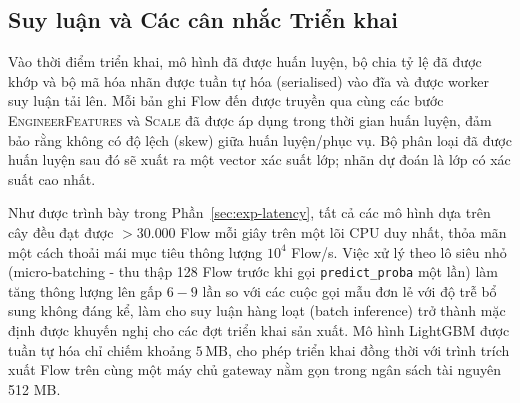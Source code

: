 \subsection{Suy luận và Các cân nhắc Triển khai}
\label{sec:inference}

Vào thời điểm triển khai, mô hình đã được huấn luyện, bộ chia tỷ lệ đã được khớp và bộ mã hóa nhãn được tuần tự hóa (serialised) vào đĩa và được worker suy luận tải lên. Mỗi bản ghi Flow đến được truyền qua cùng các bước \textsc{EngineerFeatures} và \textsc{Scale} đã được áp dụng trong thời gian huấn luyện, đảm bảo rằng không có độ lệch (skew) giữa huấn luyện/phục vụ. Bộ phân loại đã được huấn luyện sau đó sẽ xuất ra một vector xác suất lớp; nhãn dự đoán là lớp có xác suất cao nhất.

Như được trình bày trong Phần~\ref{sec:exp-latency}, tất cả các mô hình dựa trên cây đều đạt được $> 30{.}000$ Flow mỗi giây trên một lõi CPU duy nhất, thỏa mãn một cách thoải mái mục tiêu thông lượng $10^4$ Flow/s. Việc xử lý theo lô siêu nhỏ (micro-batching - thu thập 128 Flow trước khi gọi \texttt{predict\_proba} một lần) làm tăng thông lượng lên gấp $6{-}9$ lần so với các cuộc gọi mẫu đơn lẻ với độ trễ bổ sung không đáng kể, làm cho suy luận hàng loạt (batch inference) trở thành mặc định được khuyến nghị cho các đợt triển khai sản xuất. Mô hình LightGBM được tuần tự hóa chỉ chiếm khoảng $5\,\text{MB}$, cho phép triển khai đồng thời với trình trích xuất Flow trên cùng một máy chủ gateway nằm gọn trong ngân sách tài nguyên 512 MB.
